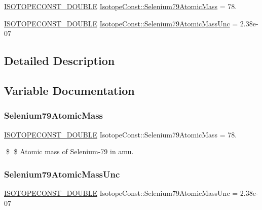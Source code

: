 \begin{DoxyCompactItemize}
\item 
\mbox{\hyperlink{group___isotope_const-_macros_ga8f45a7272ce02c0b4c65c44636ed719a}{I\+S\+O\+T\+O\+P\+E\+C\+O\+N\+S\+T\+\_\+\+D\+O\+U\+B\+LE}} \mbox{\hyperlink{group___isotope_const-_selenium-_se79_ga8d9df5473354e82002147c8be15dac6a}{Isotope\+Const\+::\+Selenium79\+Atomic\+Mass}} = 78.
\item 
\mbox{\hyperlink{group___isotope_const-_macros_ga8f45a7272ce02c0b4c65c44636ed719a}{I\+S\+O\+T\+O\+P\+E\+C\+O\+N\+S\+T\+\_\+\+D\+O\+U\+B\+LE}} \mbox{\hyperlink{group___isotope_const-_selenium-_se79_ga98c9b94a1b8116646686cfafc27ac8ea}{Isotope\+Const\+::\+Selenium79\+Atomic\+Mass\+Unc}} = 2.\+38e-\/07
\end{DoxyCompactItemize}


\subsection{Detailed Description}


\subsection{Variable Documentation}
\mbox{\label{group___isotope_const-_selenium-_se79_ga8d9df5473354e82002147c8be15dac6a}} 
\subsubsection{\texorpdfstring{Selenium79\+Atomic\+Mass}{Selenium79AtomicMass}}
{\footnotesize\ttfamily \mbox{\hyperlink{group___isotope_const-_macros_ga8f45a7272ce02c0b4c65c44636ed719a}{I\+S\+O\+T\+O\+P\+E\+C\+O\+N\+S\+T\+\_\+\+D\+O\+U\+B\+LE}} Isotope\+Const\+::\+Selenium79\+Atomic\+Mass = 78.}

\$ \$ Atomic mass of Selenium-\/79 in amu. \mbox{\label{group___isotope_const-_selenium-_se79_ga98c9b94a1b8116646686cfafc27ac8ea}} 
\subsubsection{\texorpdfstring{Selenium79\+Atomic\+Mass\+Unc}{Selenium79AtomicMassUnc}}
{\footnotesize\ttfamily \mbox{\hyperlink{group___isotope_const-_macros_ga8f45a7272ce02c0b4c65c44636ed719a}{I\+S\+O\+T\+O\+P\+E\+C\+O\+N\+S\+T\+\_\+\+D\+O\+U\+B\+LE}} Isotope\+Const\+::\+Selenium79\+Atomic\+Mass\+Unc = 2.\+38e-\/07}

